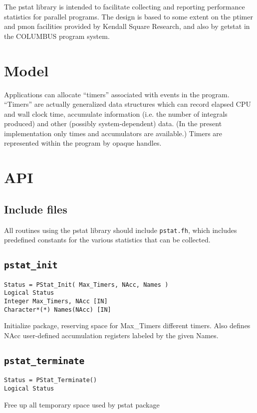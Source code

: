 
The pstat library is intended to facilitate collecting and reporting
performance statistics for parallel programs.  The design is based to
some extent on the ptimer and pmon facilities provided by Kendall
Square Research, and also by getstat in the COLUMBUS program system.

\section{Model}

Applications can allocate ``timers'' associated with events in the
program.  ``Timers'' are actually generalized data structures which
can record elapsed CPU and wall clock time, accumulate information
(i.e. the number of integrals produced) and other (possibly
system-dependent) data. (In the present implementation only times and
accumulators are available.)  Timers are represented within the
program by opaque handles.

\section{API}

\subsection{Include files}
All routines using the pstat library should include \verb+pstat.fh+,
which includes predefined constants for the various statistics that
can be collected.

\subsection{{\tt pstat\_init}}
\begin{verbatim}
Status = PStat_Init( Max_Timers, NAcc, Names )
Logical Status
Integer Max_Timers, NAcc [IN]
Character*(*) Names(NAcc) [IN]
\end{verbatim}
Initialize package, reserving space for Max\_Timers different
timers.  Also defines NAcc user-defined accumulation registers
labeled by the given Names.

\subsection{{\tt pstat\_terminate}}
\begin{verbatim}
Status = PStat_Terminate()
Logical Status
\end{verbatim}
Free up all temporary space used by pstat package

